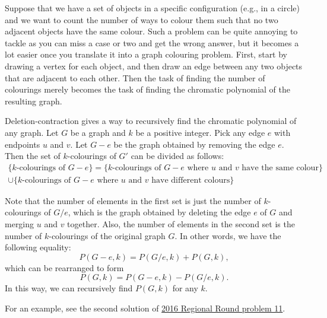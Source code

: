 \begin{technique}
    \label{teq: DC}
    Suppose that we have a set of objects in a specific configuration (e.g., in a
    circle) and we want to count the number of ways to colour them such that no
    two adjacent objects have the same colour. Such a problem can be
    quite annoying to tackle as you can miss a case or two and get the wrong
    answer, but it becomes a lot easier once you translate it into a graph
    colouring problem. First, start by drawing a vertex for each object, and
    then draw an edge between any two objects that are adjacent to each other.
    Then the task of finding the number of colourings merely becomes the task of
    finding the chromatic polynomial of the resulting graph.

    Deletion-contraction gives a way to recursively find the chromatic
    polynomial of any graph. Let $G$ be a graph and $k$ be a positive integer.
    Pick any edge $e$ with endpoints $u$ and $v$. Let $G - e$ be the graph
    obtained by removing the edge $e$. Then the set of $k$-colourings of $G'$
    can be divided as follows:
    \begin{multline*}
        \{\text{$k$-colourings of $G-e$}\}
        = \{\text{$k$-colourings of $G-e$ where $u$ and $v$ have the same
        colour}\}\\
        \cup \{\text{$k$-colourings of $G-e$ where $u$ and $v$ have different
        colours}\}
    \end{multline*}

    Note that the number of elements in the first set is just the number of
    $k$-colourings of $G/e$, which is the graph obtained by deleting the edge
    $e$ of $G$ and merging $u$ and $v$ together. Also, the number of elements in the
    second set is the number of $k$-colourings of the original graph $G$. In
    other words, we have the following equality:
    \[ P(G - e, k) = P(G/e, k) + P(G, k), \]
    which can be rearranged to form
    \[ P(G, k) = P(G - e, k) - P(G/e, k). \]
    In this way, we can recursively find $P(G, k)$ for any $k$.

    For an example, see the second solution of \hyperref[sol: 2016 Regional
    Round P11]{2016 Regional Round problem 11}.
\end{technique}
